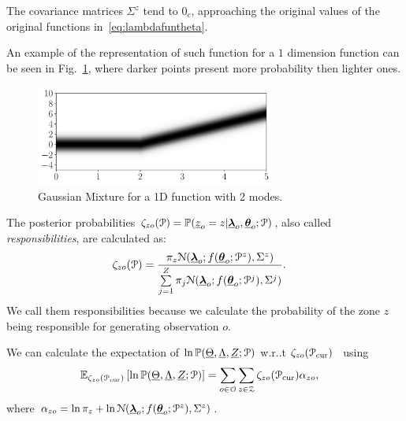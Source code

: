 \documentclass[../main.tex]{subfiles}
\begin{document}
The covariance matrices $\Sigma^{z}$ tend to $0_{c}$, approaching the original values of the original functions in~\eqref{eq:lambdafuntheta}.

An example of the representation of such function for a $1$ dimension \pwa{} function can be seen in Fig.~\ref{fig:affine_gaussian_mixture}, where darker points present more probability then lighter ones.
\begin{figure}[h]
  \centering
  \includegraphics[width=0.7\textwidth]{../img/resilient_ineq/pwa.pdf}
  \caption{Gaussian Mixture for a 1D \pwa{} function with 2 modes.}\label{fig:affine_gaussian_mixture}
\end{figure}

The posterior probabilities $\zeta_{zo}(\mathcal{P})=\mathbb{P}(\underline{z}_{o}=z|{\underline{\boldsymbol{\lambda}}}_{o},{\underline{\boldsymbol{\theta}}}_{o};\mathcal{P})$, also called \emph{responsibilities}, are calculated as:
\begin{align}
  \label{eq:responsibilities}
\zeta_{zo}(\set{P})&=\frac{\pi_{z}{\mathcal{N}(\randomvec{\lambda}_{o};f(\randomvec{\theta}_{o};\set{P}^{z}),{\Sigma^{z}})}}{\sum\limits_{j=1}^{Z}\pi_{j}\mathcal{N}(\randomvec{\lambda}_{o};f(\randomvec{\theta}_{o};\set{P}^{j}),{\Sigma^{j}})}.
\end{align}
We call them responsibilities because we calculate the probability of the zone $z$ being responsible for generating observation $o$.

We can calculate the expectation of ${\ln\mathbb{P}(\underline{\Theta},\underline{\Lambda},\underline{Z};\mathcal{P})}$ w.r..t ${\zeta_{zo}(\mathcal{P}_{\mathrm{cur}})}$~\cite[Chapter 9]{Bishop2006} using
\begin{align}
  \label{eq:completedataLogLikelihood_expectation}
\expectation[{\zeta_{zo}(\set{P}_{\mathrm{cur}})}]{\ln\probability{\random{\Theta},\random{\Lambda},\random{Z};\set{P}}}&= \sum_{o\in\set{O}}\sum_{z\in\set{Z}}  \zeta_{zo}(\set{P}_{\mathrm{cur}})\alpha_{zo},
\end{align}
where ${\alpha_{zo}=\ln{\pi_{z}}+\ln{\mathcal{N}({\underline{\boldsymbol{\lambda}}}_{o};f({\underline{\boldsymbol{\theta}}}_{o};\mathcal{P}^{z}),{\Sigma^{z}})}}$.
\end{document}
